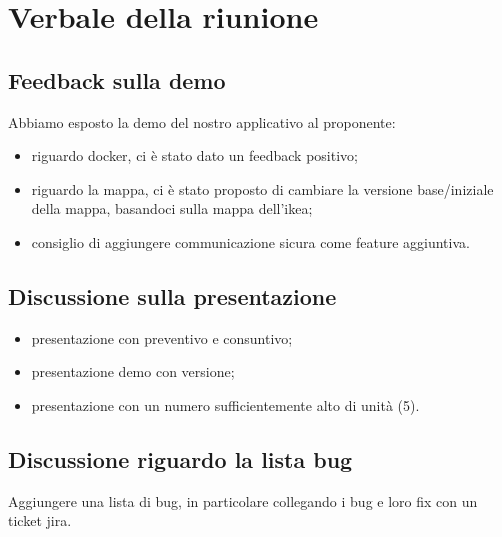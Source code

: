\section{Verbale della riunione}

\subsection{Feedback sulla demo}
Abbiamo esposto la demo del nostro applicativo al proponente:
\begin{itemize}
	\item riguardo docker, ci è stato dato un feedback positivo;
	\item riguardo la mappa, ci è stato proposto di cambiare la versione base/iniziale della mappa, basandoci sulla mappa dell'ikea;
	\item consiglio di aggiungere communicazione sicura come feature aggiuntiva.
\end{itemize}
\subsection{Discussione sulla presentazione}
\begin{itemize}
	\item presentazione con preventivo e consuntivo;
	\item presentazione demo con versione;
	\item presentazione con un numero sufficientemente alto di unità (5).
\end{itemize}
\subsection{Discussione riguardo la lista bug}
Aggiungere una lista di bug, in particolare collegando i bug e loro fix con un ticket jira.